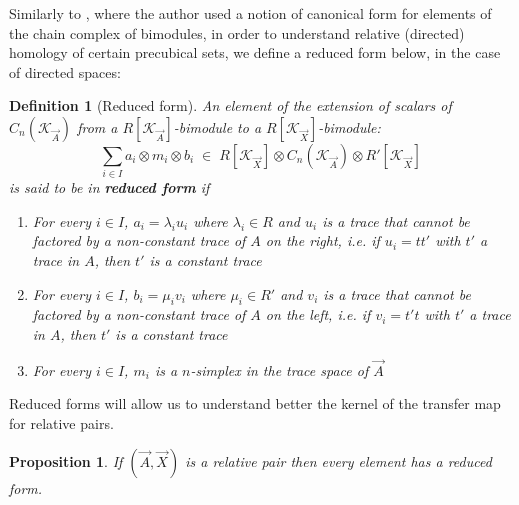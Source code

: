 \documentclass[a4paper,fleqn]{cas-sc}
\newtheorem{prop}[thm]{Proposition}%
\newtheorem{dfnt}{Definition}%
\newcommand{\K}{\mathcal{K}}
\begin{document}
Similarly to \cite{eric}, where the author used a notion of canonical form for elements of the chain complex of bimodules, in order to understand relative (directed) homology of certain precubical sets, we define a reduced form below, in the case of directed spaces:  

\begin{dfnt}[Reduced form]
An element of the extension of scalars of $C_n(\K_{\Vec{A}})$ from a $R[\K_{\Vec{A}}]$-bimodule to a $R[\K_{\Vec{X}}]$-bimodule: 
\[\sum_{i \in I} a_i \otimes m_i \otimes b_i 
\;
\in
\;
R[\K_{\Vec{X}}] \otimes C_n(\K_{\Vec{A}}) \otimes R'[\K_{\Vec{X}}]\]
is said to be in \textbf{reduced form} if 
\begin{enumerate}
    \item For every $i \in I$, $a_i = \lambda_i u_i$ where $\lambda_i \in R$ and $u_i$ is a trace that cannot be factored by a non-constant trace of $A$ on the right, 
    i.e. if $u_i = t t'$ with $t'$ a trace in $A$, then $t'$ is a constant trace
    \item For every $i \in I$, $b_i = \mu_i v_i$ where $\mu_i \in R'$ and $v_i$ is a trace that cannot be factored by a non-constant trace of $A$ on the left, 
    i.e. if $v_i = t' t$ with $t'$ a trace in $A$, then $t'$ is a constant trace
    \item For every $i \in I$, $m_i$ is a $n$-simplex in the trace space of $\Vec{A}$
    
\end{enumerate}
\end{dfnt}

Reduced forms will allow us to understand better the kernel of the transfer map for relative pairs.

\begin{prop}
If $(\Vec{A}, \Vec{X})$ is a relative pair then every element has a reduced form.
\end{prop}
\end{document}
